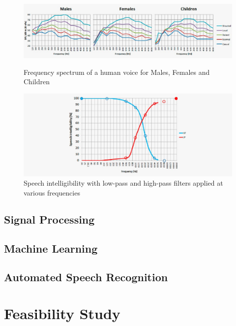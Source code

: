 \documentclass[sigconf, nonacm]{acmart}
\begin{document}
\begin{figure}[H]
  \centering
  \includegraphics[width=\linewidth]{embed/Speech_frequency_spectrum.jpg}
  \caption{Frequency spectrum of a human voice for Males, Females and Children \cite{DPAMicrophonesFactsAboutSpeechIntelligibility}}
  \label{fig:SpeechFrequencySpectrum}

  \vspace{0.5cm}

  \includegraphics[width=\linewidth]{embed/Speech_Intelligibility_Low_High_Pass_Filter.jpg}
  \caption{Speech intelligibility with low-pass and high-pass filters applied at various frequencies \cite{DPAMicrophonesFactsAboutSpeechIntelligibility}}
  \label{fig:SpeechIntelligibility}
\end{figure}

\subsection{Signal Processing}
\subsection{Machine Learning}
\subsection{Automated Speech Recognition}
\section{Feasibility Study}
\end{document}
